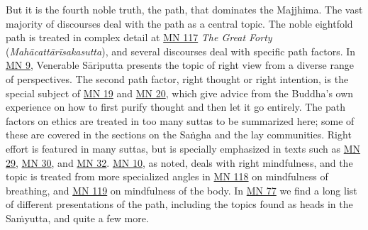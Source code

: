 \documentclass[12pt,openany]{book}%
\begin{document}
But it is the fourth noble truth, the path, that dominates the Majjhima. The vast majority of discourses deal with the path as a central topic. The noble eightfold path is treated in complex detail at \href{https://suttacentral.net/mn117}{MN 117} \textit{The Great Forty} (\textit{\textsanskrit{Mahācattārīsakasutta}}), and several discourses deal with specific path factors. In \href{https://suttacentral.net/mn9}{MN 9}, Venerable \textsanskrit{Sāriputta} presents the topic of right view from a diverse range of perspectives. The second path factor, right thought or right intention, is the special subject of \href{https://suttacentral.net/mn19}{MN 19} and \href{https://suttacentral.net/mn20}{MN 20}, which give advice from the Buddha’s own experience on how to first purify thought and then let it go entirely. The path factors on ethics are treated in too many suttas to be summarized here; some of these are covered in the sections on the \textsanskrit{Saṅgha} and the lay communities. Right effort is featured in many suttas, but is specially emphasized in texts such as \href{https://suttacentral.net/mn29}{MN 29}, \href{https://suttacentral.net/mn30}{MN 30}, and \href{https://suttacentral.net/mn32}{MN 32}. \href{https://suttacentral.net/mn10}{MN 10}, as noted, deals with right mindfulness, and the topic is treated from more specialized angles in \href{https://suttacentral.net/mn118}{MN 118} on mindfulness of breathing, and \href{https://suttacentral.net/mn119}{MN 119} on mindfulness of the body. In \href{https://suttacentral.net/mn77}{MN 77} we find a long list of different presentations of the path, including the topics found as heads in the \textsanskrit{Saṁyutta}, and quite a few more.
\end{document}
